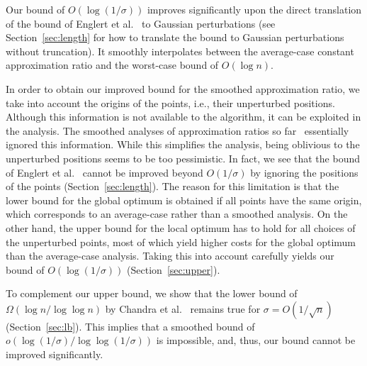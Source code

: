 \documentclass[11pt,DIV=12,a4paper]{scrartcl}
\begin{document}
Our bound of $O(\log(1/\sigma))$ improves significantly upon the direct
translation of the bound of Englert et al.~\cite{EnglertEA:2Opt:2014} to Gaussian perturbations (see Section~\ref{sec:length} for how to
translate the bound to Gaussian perturbations without truncation).
It smoothly interpolates between the average-case constant approximation ratio and the worst-case bound of $O(\log n)$. 

In order to obtain our improved bound for the smoothed approximation ratio, we take into account the origins 
of the points, i.e., their unperturbed positions. Although this information is not available to the algorithm,
it can be exploited in the analysis.
The smoothed analyses of approximation ratios so far~\cite{EnglertEA:2Opt:2014,BrunschEA:Scheduling:2014,CurticapeanK15,BlaeserEA:Partitioning:2013,Etscheid15,KargerOnak:SmoothedPacking:2007}
essentially ignored this information. While this simplifies the analysis,
being oblivious to the unperturbed positions seems to be too pessimistic.
In fact, we see that the bound of Englert et al.~\cite{EnglertEA:2Opt:2014} cannot be improved beyond $O(1/\sigma)$
by ignoring the positions of the points (Section~\ref{sec:length}).
The reason for this limitation is that the lower bound for the global optimum is obtained
if all points have the same origin, which corresponds to an average-case rather than a smoothed analysis.
On the other hand, the upper bound for the local optimum has to hold for all choices of the unperturbed points, most of which
yield higher costs for the global optimum than the average-case analysis. Taking this into account carefully yields our bound of $O(\log(1/\sigma))$
(Section~\ref{sec:upper}).

To complement our upper bound, we show that the lower bound of $\Omega(\log n/\log \log n)$ by Chandra et al.~\cite{ChandraEA:OldOpt:1999} remains
true for $\sigma = O(1/\sqrt n)$ (Section~\ref{sec:lb}). This implies that a smoothed bound
of $o(\log(1/\sigma)/\log\log(1/\sigma))$ is impossible, and, thus, our bound cannot be improved significantly.
\end{document}
